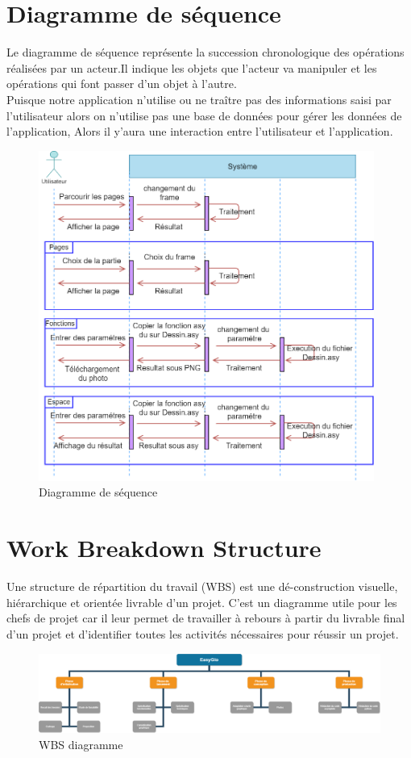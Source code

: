 \documentclass[a4paper]{report}
\begin{document}
\section{Diagramme de séquence}
Le diagramme de séquence représente la succession chronologique des opérations réalisées par un acteur.Il indique les objets que l'acteur va manipuler et les opérations qui font passer d'un objet à l'autre.\\
Puisque notre application n'utilise ou  ne traître pas des informations saisi par l'utilisateur alors on n'utilise pas une base de données pour gérer les données de l'application, Alors il y'aura une interaction entre l'utilisateur et l'application.
\begin{figure}[!h]
    \centering
    \includegraphics[width=11cm]{images/DS.png}
    \caption{Diagramme de séquence}
    \label{fig:Diagramme de séquence}
\end{figure}
\newpage
\section{Work Breakdown Structure}
Une structure de répartition du travail (WBS) est une dé-construction visuelle, hiérarchique et orientée livrable d'un projet. C'est un diagramme utile pour les chefs de projet car il leur permet de travailler à rebours à partir du livrable final d'un projet et d'identifier toutes les activités nécessaires pour réussir un projet.
\begin{figure}[!h]
    \centering
    \includegraphics[width=15cm]{images/WBS.png}
    \caption{WBS diagramme}
    \label{WBS diagrammme}
\end{figure}
\newpage
\end{document}
